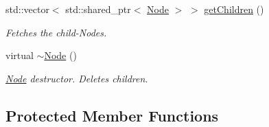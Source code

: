 \begin{DoxyCompactItemize}
std\+::vector$<$ std\+::shared\+\_\+ptr$<$ \mbox{\hyperlink{classsage_1_1Node}{Node}} $>$ $>$ \mbox{\hyperlink{classsage_1_1Node_a13a5d97132d87b57bd68eb8662f1b505}{get\+Children}} ()
\begin{DoxyCompactList}\small\item\em Fetches the child-\/\+Nodes. \end{DoxyCompactList}\item 
virtual \mbox{\hyperlink{classsage_1_1Node_aa0840c3cb5c7159be6d992adecd2097c}{$\sim$\+Node}} ()
\begin{DoxyCompactList}\small\item\em \mbox{\hyperlink{classsage_1_1Node}{Node}} destructor. Deletes children. \end{DoxyCompactList}\end{DoxyCompactItemize}
\subsection*{Protected Member Functions}
